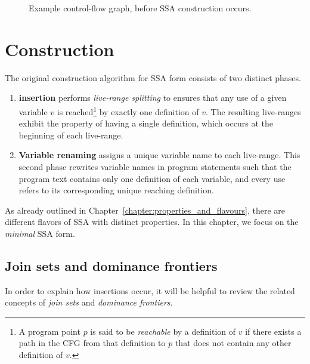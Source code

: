 {\begin{figure}
  \begin{center}
  \end{center}
\caption{\label{fig:classical_construction_algorithm:examplecfg}Example control-flow graph, before
  SSA construction occurs.}
\end{figure}

\section{Construction}
\label{sec:classical_construction}

The original construction algorithm for SSA form consists of two distinct phases.
\begin{enumerate}
\item \textbf{\phifun insertion} performs \textit{live-range splitting} to ensures that any use of a given variable $v$ is reached\footnote{A program point $p$ is said to be \emph{reachable} by a definition of $v$ if there exists a path in the CFG from that definition to $p$ that does not contain any other definition of $v$.} by exactly one definition of $v$. 
  The resulting live-ranges exhibit the property of having a single definition, which occurs at the beginning of each live-range.
\item \textbf{Variable renaming} assigns a unique variable name to each live-range. 
  This second phase rewrites variable names in program statements such that the program text contains only one definition of each variable, and every use refers to its corresponding unique reaching definition.
\end{enumerate}

As already outlined in Chapter~\ref{chapter:properties_and_flavours}, there are different flavors of SSA with distinct properties. 
In this chapter, we focus on the \textit{minimal} SSA form.

\subsection{Join sets and dominance frontiers}
\label{subsec:JS-DF}
In order to explain how \phifun insertions occur, it will be helpful to review the related concepts of \textit{join sets} and \textit{dominance frontiers}.

}
